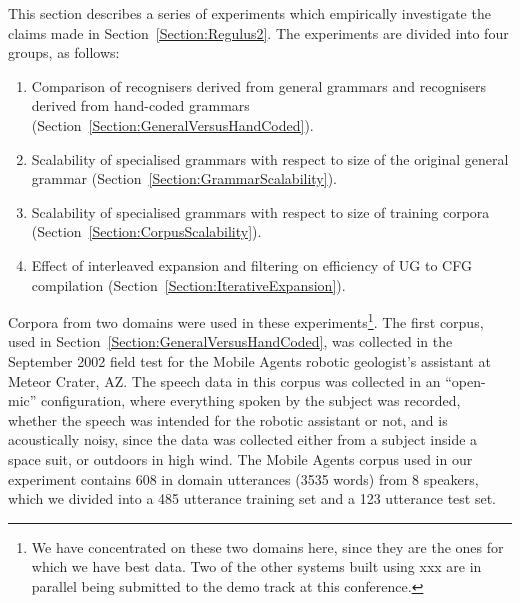 \documentclass[11pt]{article}
\begin{document}
This section describes a series of experiments which empirically
investigate the claims made in Section~\ref{Section:Regulus2}.
The experiments are divided into four groups, as follows:
\begin{enumerate}

\item Comparison of recognisers derived from general grammars and
recognisers derived from hand-coded grammars (Section~\ref{Section:GeneralVersusHandCoded}).

\item Scalability of specialised grammars with respect to size
of the original general grammar (Section~\ref{Section:GrammarScalability}).

\item Scalability of specialised grammars with respect to size
of training corpora (Section~\ref{Section:CorpusScalability}).


\item Effect of interleaved expansion and filtering on efficiency of UG
to CFG compilation (Section~\ref{Section:IterativeExpansion}).

\end{enumerate}

Corpora from two domains were used in these experiments\footnote{We have
concentrated on these two domains here, since they are the ones for
which we have best data. Two of the other systems built using {\sc
xxx} are in parallel being submitted to the demo track at this
conference.}. The first corpus, used in
Section~\ref{Section:GeneralVersusHandCoded}, was collected in the
September 2002 field test for the Mobile Agents robotic geologist's
assistant at Meteor Crater, AZ.  The speech data in this corpus was
collected in an ``open-mic'' configuration, where everything spoken by
the subject was recorded, whether the speech was intended for the
robotic assistant or not, and is acoustically noisy, since the data
was collected either from a subject inside a space suit, or outdoors
in high wind.
The Mobile Agents corpus used in our experiment contains 608 in domain
utterances (3535 words) from 8 speakers, which we divided into a 485
utterance training set and a 123 utterance test set.
\end{document}
